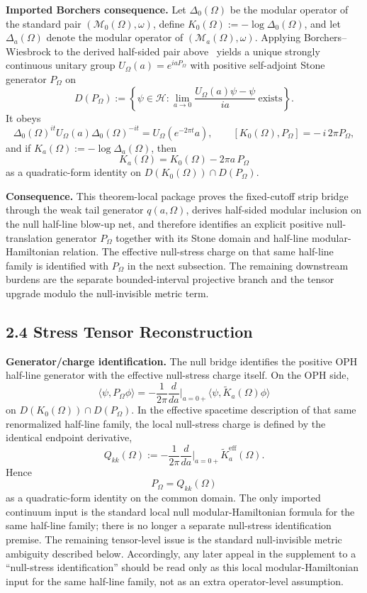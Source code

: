 \textbf{Imported Borchers consequence.} Let \(\Delta_0(\Omega)\) be the modular operator of the standard pair \((\mathcal M_0(\Omega),\omega)\), define \(K_0(\Omega):=-\log \Delta_0(\Omega)\), and let \(\Delta_a(\Omega)\) denote the modular operator of \((\mathcal M_a(\Omega),\omega)\). Applying Borchers--Wiesbrock to the derived half-sided pair above~\cite{wiesbrock93} yields a unique strongly continuous unitary group \(U_\Omega(a)=e^{iaP_\Omega}\) with positive self-adjoint Stone generator \(P_\Omega\) on
\[
D(P_\Omega)
:=
\left\{
\psi\in\mathcal H:
\lim_{a\to0}\frac{U_\Omega(a)\psi-\psi}{ia}\ \text{exists}
\right\}.
\]
It obeys
\[
\Delta_0(\Omega)^{it}U_\Omega(a)\Delta_0(\Omega)^{-it}
=
U_\Omega(e^{-2\pi t}a),
\qquad
[K_0(\Omega),P_\Omega]=-\,i\,2\pi P_\Omega,
\]
and if \(K_a(\Omega):=-\log \Delta_a(\Omega)\), then
\[
K_a(\Omega)=K_0(\Omega)-2\pi a\,P_\Omega
\]
as a quadratic-form identity on \(D(K_0(\Omega))\cap D(P_\Omega)\).

\textbf{Consequence.} This theorem-local package proves the fixed-cutoff strip bridge through the weak tail generator \(q(a,\Omega)\), derives half-sided modular inclusion on the null half-line blow-up net, and therefore identifies an explicit positive null-translation generator \(P_\Omega\) together with its Stone domain and half-line modular-Hamiltonian relation. The effective null-stress charge on that same half-line family is identified with \(P_\Omega\) in the next subsection. The remaining downstream burdens are the separate bounded-interval projective branch and the tensor upgrade modulo the null-invisible metric term.
\subsection{2.4 Stress Tensor Reconstruction}\label{24-stress-tensor-reconstruction}

\textbf{Generator/charge identification.} The null bridge identifies the positive OPH half-line generator with the effective null-stress charge itself. On the OPH side,
\[
\langle\psi,P_\Omega\phi\rangle
=
-\frac{1}{2\pi}\frac{d}{da}\Big|_{a=0+}
\langle\psi,\widetilde K_a(\Omega)\phi\rangle
\]
on \(D(K_0(\Omega))\cap D(P_\Omega)\). In the effective spacetime description of that same renormalized half-line family, the local null-stress charge is defined by the identical endpoint derivative,
\[
Q_{kk}(\Omega)
:=
-\frac{1}{2\pi}\frac{d}{da}\Big|_{a=0+}\widetilde K^{\mathrm{eff}}_a(\Omega).
\]
Hence
\[
P_\Omega = Q_{kk}(\Omega)
\]
as a quadratic-form identity on the common domain. The only imported continuum input is the standard local null modular-Hamiltonian formula for the same half-line family; there is no longer a separate null-stress identification premise. The remaining tensor-level issue is the standard null-invisible metric ambiguity described below. Accordingly, any later appeal in the supplement to a ``null-stress identification'' should be read only as this local modular-Hamiltonian input for the same half-line family, not as an extra operator-level assumption.

